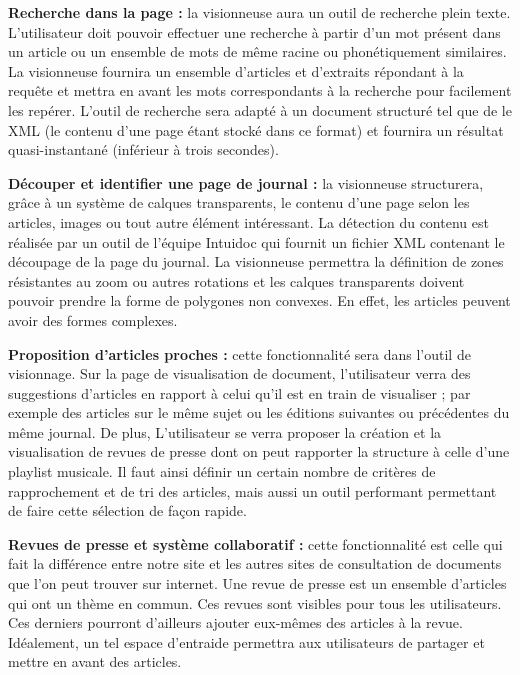     \textbf{Recherche dans la page :} la visionneuse aura un outil de recherche plein texte. L'utilisateur doit pouvoir effectuer une recherche à partir d’un mot présent dans un article ou un ensemble de mots de même racine ou phonétiquement similaires.
    La visionneuse fournira un ensemble d’articles et d'extraits répondant à la requête et mettra en avant les mots correspondants à la recherche pour facilement les repérer.
    L’outil de recherche sera adapté à un document structuré tel que de le XML (le contenu d’une page étant stocké dans ce format) et fournira
    un résultat quasi-instantané (inférieur à trois secondes).


    \textbf{Découper et identifier une page de journal :} la visionneuse structurera, grâce à un système de calques transparents, le contenu d’une page selon
    les articles, images ou tout autre élément intéressant. La détection du contenu est réalisée par un outil de l’équipe Intuidoc qui fournit un
    fichier XML contenant le découpage de la page du journal. La visionneuse permettra la définition de zones résistantes au zoom ou autres
    rotations et les calques transparents doivent pouvoir prendre la forme de polygones non convexes. En effet, les articles peuvent avoir des formes complexes.


    \textbf{Proposition d’articles proches :} cette fonctionnalité sera dans l’outil de visionnage. Sur la page de visualisation de document, l'utilisateur verra des suggestions d'articles en rapport à celui qu'il est en train de visualiser ; par exemple des articles sur le même sujet ou les éditions suivantes ou précédentes
    du même journal. De plus, L'utilisateur se verra proposer la création et la visualisation de revues de presse dont on peut rapporter la structure
    à celle d’une playlist musicale. Il faut ainsi définir un certain nombre de critères de rapprochement et de tri des articles, mais aussi un outil performant permettant de faire cette sélection de façon rapide.

    \textbf{Revues de presse et système collaboratif :} cette fonctionnalité est celle qui fait la différence entre notre site et les autres sites de consultation de documents que l'on peut trouver sur internet. Une revue de presse est un ensemble d'articles qui ont un thème en commun. Ces revues sont visibles pour tous les utilisateurs. Ces derniers pourront d'ailleurs ajouter eux-mêmes des articles à la revue. Idéalement, un tel espace d’entraide permettra aux utilisateurs de partager et mettre en avant des articles.
		
